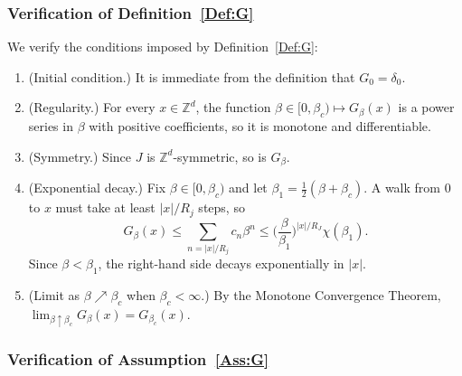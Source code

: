 \documentclass[11pt,a4paper]{article}
\numberwithin{equation}{section}
\theoremstyle{plain}
\theoremstyle{definition}
\newcommand\1{\mathds{1}}
\begin{document}
\subsubsection{Verification of Definition~\ref{Def:G}}
\label{sec:SAW-DefG}


We verify the conditions imposed by Definition~\ref{Def:G}:


\begin{enumerate}
	\item[$(i)$] (Initial condition.) It is immediate from the definition that $G_0=\delta_{0}$.
	\item[$(ii)$] (Regularity.) For every $x\in \mathbb Z^d$, the function
    $\beta\in [0,\beta_c)\mapsto G_\beta(x)$ is a power series in $\beta$ with positive
    coefficients, so it is monotone and differentiable.
	\item[$(iii)$] (Symmetry.) Since $J$ is $\mathbb Z^d$-symmetric, so is  $G_\beta$.
	\item[$(iv)$] (Exponential decay.)
Fix $\beta\in [0,\beta_c)$ and let $\beta_1=\frac 12 (\beta+\beta_c)$.
A walk from $0$ to $x$ must take at least $|x|/R_j$ steps, so
\begin{equation}
    G_\beta(x) \le \sum_{n=|x|/R_j}c_n\beta^n
    \le
    \Big(\frac{\beta}{\beta_1}\Big)^{|x|/R_J} \chi(\beta_1).
\end{equation}
Since $\beta<\beta_1$, the right-hand side decays exponentially in $|x|$.
    \item[$(v)$] (Limit as $\beta\nearrow\beta_c$ when $\beta_c<\infty$.)
    By the Monotone Convergence Theorem,
     $\lim_{\beta \uparrow \beta_c}G_{\beta}(x) = G_{\beta_c}(x)$.
	\end{enumerate}

\subsubsection{Verification of Assumption~\ref{Ass:G}}
\label{sec:SAW-AssG}
\end{document}
